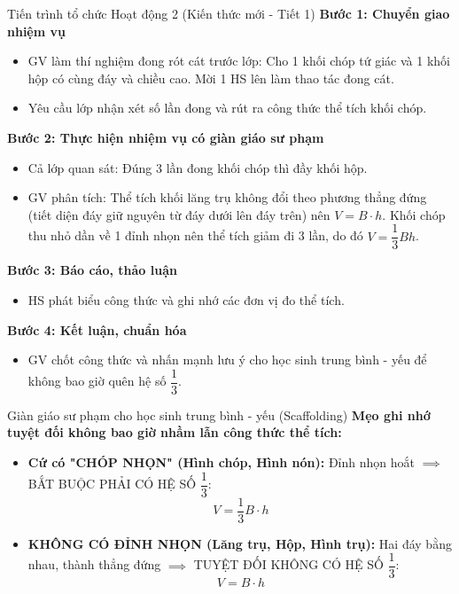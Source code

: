 \documentclass[12pt, a4paper]{article}
\begin{document}
\begin{pedabox}{Tiến trình tổ chức Hoạt động 2 (Kiến thức mới - Tiết 1)}
    \textbf{Bước 1: Chuyển giao nhiệm vụ}
    \begin{itemize}[leftmargin=0.6cm]
        \item GV làm thí nghiệm đong rót cát trước lớp: Cho 1 khối chóp tứ giác và 1 khối hộp có cùng đáy và chiều cao. Mời 1 HS lên làm thao tác đong cát.
        \item Yêu cầu lớp nhận xét số lần đong và rút ra công thức thể tích khối chóp.
    \end{itemize}

    \textbf{Bước 2: Thực hiện nhiệm vụ có giàn giáo sư phạm}
    \begin{itemize}[leftmargin=0.6cm]
        \item Cả lớp quan sát: Đúng 3 lần đong khối chóp thì đầy khối hộp.
        \item GV phân tích: Thể tích khối lăng trụ không đổi theo phương thẳng đứng (tiết diện đáy giữ nguyên từ đáy dưới lên đáy trên) nên $V = B \cdot h$. Khối chóp thu nhỏ dần về 1 đỉnh nhọn nên thể tích giảm đi 3 lần, do đó $V = \dfrac{1}{3}Bh$.
    \end{itemize}

    \textbf{Bước 3: Báo cáo, thảo luận}
    \begin{itemize}[leftmargin=0.6cm]
        \item HS phát biểu công thức và ghi nhớ các đơn vị đo thể tích.
    \end{itemize}

    \textbf{Bước 4: Kết luận, chuẩn hóa}
    \begin{itemize}[leftmargin=0.6cm]
        \item GV chốt công thức và nhấn mạnh lưu ý cho học sinh trung bình - yếu để không bao giờ quên hệ số $\dfrac{1}{3}$.
    \end{itemize}
\end{pedabox}

\begin{scaffoldbox}{Giàn giáo sư phạm cho học sinh trung bình - yếu (Scaffolding)}
    \textbf{Mẹo ghi nhớ tuyệt đối không bao giờ nhầm lẫn công thức thể tích:}
    \begin{itemize}[leftmargin=0.6cm]
        \item \textbf{Cứ có "CHÓP NHỌN" (Hình chóp, Hình nón):} Đỉnh nhọn hoắt $\implies$ BẮT BUỘC PHẢI CÓ HỆ SỐ $\dfrac{1}{3}$:
        $$V = \dfrac{1}{3} B \cdot h$$
        \item \textbf{KHÔNG CÓ ĐỈNH NHỌN (Lăng trụ, Hộp, Hình trụ):} Hai đáy bằng nhau, thành thẳng đứng $\implies$ TUYỆT ĐỐI KHÔNG CÓ HỆ SỐ $\dfrac{1}{3}$:
        $$V = B \cdot h$$
    \end{itemize}
\end{scaffoldbox}
\end{document}
